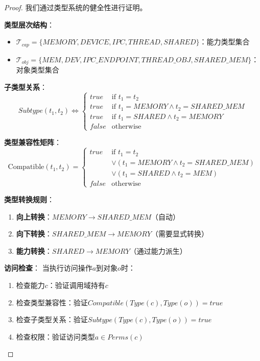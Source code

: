 \documentclass{article}
\theoremstyle{definition}
\theoremstyle{remark}
\begin{document}
\begin{proof}
    我们通过类型系统的健全性进行证明。

    \textbf{类型层次结构}：
    \begin{itemize}
        \item $\mathcal{T}_{cap} = \{MEMORY, DEVICE, IPC, THREAD, SHARED\}$：能力类型集合
        \item $\mathcal{T}_{obj} = \{MEM, DEV, IPC\_ENDPOINT, THREAD\_OBJ, SHARED\_MEM\}$：对象类型集合
    \end{itemize}

    \textbf{子类型关系}：
    \[
    Subtype(t_1, t_2) \iff 
    \begin{cases}
        true & \text{if } t_1 = t_2 \\
        true & \text{if } t_1 = MEMORY \land t_2 = SHARED\_MEM \\
        true & \text{if } t_1 = SHARED \land t_2 = MEMORY \\
        false & \text{otherwise}
    \end{cases}
    \]

    \textbf{类型兼容性矩阵}：
    \[
    \text{Compatible}(t_1, t_2) = 
    \begin{cases}
        true & \text{if } t_1 = t_2 \\
             & \lor (t_1 = MEMORY \land t_2 = SHARED\_MEM) \\
             & \lor (t_1 = SHARED \land t_2 = MEM) \\
        false & \text{otherwise}
    \end{cases}
    \]

    \textbf{类型转换规则}：
    \begin{enumerate}
        \item \textbf{向上转换}：$MEMORY \rightarrow SHARED\_MEM$（自动）
        \item \textbf{向下转换}：$SHARED\_MEM \rightarrow MEMORY$（需要显式转换）
        \item \textbf{能力转换}：$SHARED \rightarrow MEMORY$（通过能力派生）
    \end{enumerate}

    \textbf{访问检查}：
    当执行访问操作$a$到对象$o$时：
    \begin{enumerate}
        \item 检查能力$c$：验证调用域持有$c$
        \item 检查类型兼容性：验证$Compatible(Type(c), Type(o)) = true$
        \item 检查子类型关系：验证$Subtype(Type(c), Type(o)) = true$
        \item 检查权限：验证访问类型$a \in Perms(c)$
    \end{enumerate}


\end{proof}
\end{document}

